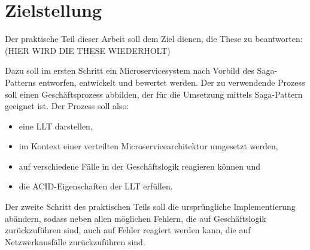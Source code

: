 \section{Zielstellung}

Der praktische Teil dieser Arbeit soll dem Ziel dienen, die These zu beantworten:
(HIER WIRD DIE THESE WIEDERHOLT)

Dazu soll im ersten Schritt ein Microservicesystem  nach Vorbild des Saga-Patterns entworfen, entwickelt und bewertet werden. Der zu verwendende Prozess soll einen Geschäftsprozess abbilden, der für die Umsetzung mittels Saga-Pattern geeignet ist. Der Prozess soll also:
\begin{itemize}
	\item eine LLT darstellen,
	\item im Kontext einer verteilten Microservicearchitektur umgesetzt werden,
	\item auf verschiedene Fälle in der Geschäftslogik reagieren können und
	\item die ACID-Eigenschaften der LLT erfüllen.
\end{itemize}

Der zweite Schritt des praktischen Teils soll die ursprüngliche Implementierung abändern, sodass neben allen möglichen Fehlern, die auf Geschäftslogik zurückzuführen sind, auch auf Fehler reagiert werden kann, die auf Netzwerkausfälle zurückzuführen sind. 